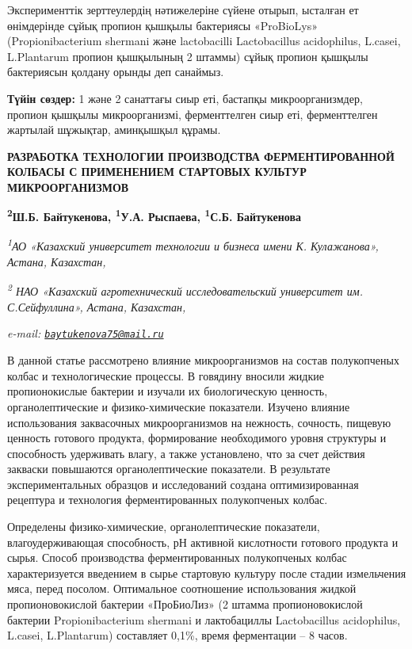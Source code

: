 Эксперименттік зерттеулердің нәтижелеріне сүйене отырып, ысталған ет
өнімдерінде сұйық пропион қышқылы бактериясы «ProBioLys»
(Propionibacterium shermani және lactobacilli Lactobacillus acidophilus,
L.casei, L.Plantarum пропион қышқылының 2 штаммы) сұйық пропион қышқылы
бактериясын қолдану орынды деп санаймыз.

{\bfseries Түйін сөздер:} 1 және 2 санаттағы сиыр еті, бастапқы
микроорганизмдер, пропион қышқылы микроорганизмі, ферменттелген сиыр
еті, ферменттелген жартылай шұжықтар, аминқышқыл құрамы.

\begin{articleheader}
{\bfseries РАЗРАБОТКА ТЕХНОЛОГИИ ПРОИЗВОДСТВА ФЕРМЕНТИРОВАННОЙ КОЛБАСЫ С
ПРИМЕНЕНИЕМ СТАРТОВЫХ КУЛЬТУР МИКРООРГАНИЗМОВ}

{\bfseries \textsuperscript{2}Ш.Б. Байтукенова\textsuperscript{\envelope },
\textsuperscript{1}У.А. Рыспаева, \textsuperscript{1}С.Б. Байтукенова}
\end{articleheader}

\begin{affiliation}
\emph{\textsuperscript{1}АО «Казахский университет технологии и бизнеса
имени К. Кулажанова», Астана, Казахстан,}

\emph{\textsuperscript{2} НАО «Казахский агротехнический
исследовательский университет им. С.Сейфуллина», Астана, Казахстан,}

\emph{e-mail:
\href{mailto:baytukenova75@mail.ru}{\nolinkurl{baytukenova75@mail.ru}}}
\end{affiliation}

В данной статье рассмотрено влияние микроорганизмов на состав
полукопченых колбас и технологические процессы. В говядину вносили
жидкие пропионокислые бактерии и изучали их биологическую ценность,
органолептические и физико-химические показатели. Изучено влияние
использования заквасочных микроорганизмов на нежность, сочность, пищевую
ценность готового продукта, формирование необходимого уровня структуры и
способность удерживать влагу, а также установлено, что за счет действия
закваски повышаются органолептические показатели. В результате
экспериментальных образцов и исследований создана оптимизированная
рецептура и технология ферментированных полукопченых колбас.

Определены физико-химические, органолептические показатели,
влагоудерживающая способность, рН активной кислотности готового продукта
и сырья. Способ производства ферментированных полукопченых колбас
характеризуется введением в сырье стартовую культуру после стадии
измельчения мяса, перед посолом. Оптимальное соотношение использования
жидкой пропионовокислой бактерии «ПроБиоЛиз» (2 штамма пропионовокислой
бактерии Propionibacterium shermani и лактобациллы Lactobacillus
acidophilus, L.casei, L.Plantarum) составляет 0,1\%, время ферментации
-- 8 часов.

